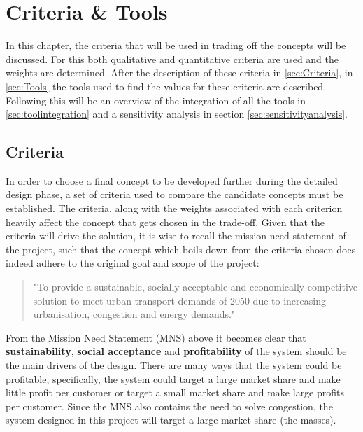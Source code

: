\newpage
\chapter{Criteria \& Tools}
\label{CriteriaTools}

In this chapter, the criteria that will be used in trading off the concepts will be discussed. For this both qualitative and quantitative criteria are used and the weights are determined. After the description of these criteria in \autoref{sec:Criteria}, in \autoref{sec:Tools} the tools used to find the values for these criteria are described. Following this will be an overview of the integration of all the tools in \ref{sec:toolintegration} and a sensitivity analysis in section \ref{sec:sensitivityanalysis}. 



\section{Criteria}
\label{sec:Criteria}



In order to choose a final concept to be developed further during the detailed design phase, a set of criteria used to compare the candidate concepts must be established. The criteria, along with the weights associated with each criterion heavily affect the concept that gets chosen in the trade-off. Given that the criteria will drive the solution, it is wise to recall the mission need statement of the project, such that the concept which boils down from the criteria chosen does indeed adhere to the original goal and scope of the project:

\begin{quote}
    "To provide a sustainable, socially acceptable and economically competitive solution to meet urban transport demands of 2050 due to increasing urbanisation, congestion and energy demands."
\end{quote}

From the Mission Need Statement (MNS) above it becomes clear that \textbf{sustainability}, \textbf{social acceptance} and \textbf{profitability} of the system should be the main drivers of the design. There are many ways that the system could be profitable, specifically, the system could target a large market share and make little profit per customer or target a small market share and make large profits per customer. Since the MNS also contains the need to solve congestion, the system designed in this project will target a large market share (the masses).

